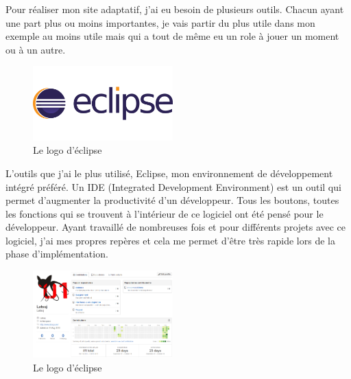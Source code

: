 \documentclass{article}
\begin{document}
Pour r\'ealiser mon site adaptatif, j'ai eu besoin de plusieurs outils. Chacun ayant une part plus ou moins importantes, je vais partir du plus utile dans mon exemple au moins utile mais qui a tout de m\^eme eu un role \`a jouer un moment ou \`a un autre.\\
\begin{figure}
  \vspace{-20pt}
  \begin{center}
    \includegraphics[width=0.48\textwidth]{p22}
  \end{center}
  \vspace{-20pt}
  \caption{Le logo d'\'eclipse}
  \vspace{-10pt}
\end{figure}

L'outils que j'ai le plus utilis\'e, Eclipse, mon environnement de d\'eveloppement int\'egr\'e pr\'ef\'er\'e. Un IDE (Integrated Development Environment) est un outil qui permet d'augmenter la productivit\'e d'un d\'eveloppeur. Tous les boutons, toutes les fonctions qui se trouvent \`a l'int\'erieur de ce logiciel ont \'et\'e pens\'e pour le d\'eveloppeur. Ayant travaill\'e de nombreuses fois et pour diff\'erents projets avec ce logiciel, j'ai mes propres rep\`eres et cela me permet d'\^etre tr\`es rapide lors de la phase d'impl\'ementation.\\
\begin{figure}
  \vspace{-20pt}
  \begin{center}
    \includegraphics[width=0.48\textwidth]{p23}
  \end{center}
  \vspace{-20pt}
  \caption{Le logo d'\'eclipse}
  \vspace{-10pt}
\end{figure}
\end{document}
